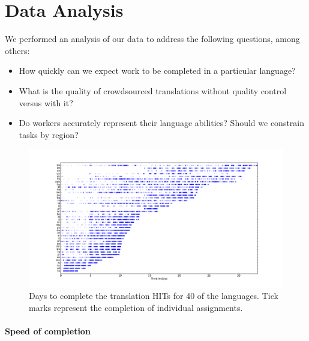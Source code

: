 \documentclass[11pt]{article}
\begin{document}
\section{Data Analysis}

We performed an analysis of our data to address the following questions, among others:
\begin{itemize}
\item How quickly can we expect work to be completed in a particular language? 
\item What is the quality of crowdsourced translations without quality control versus with it? 
\item Do workers accurately represent their language abilities?  Should we constrain tasks by region? 
\end{itemize}


\begin{figure}[h]
\centering
\includegraphics[height=\linewidth,angle=270]{final-figures/completetime}
\caption{Days to complete the translation HITs for 40 of the languages. Tick marks represent the completion of individual assignments. }
\label{completion-time}
\end{figure}

\paragraph{Speed of completion}
\end{document}

